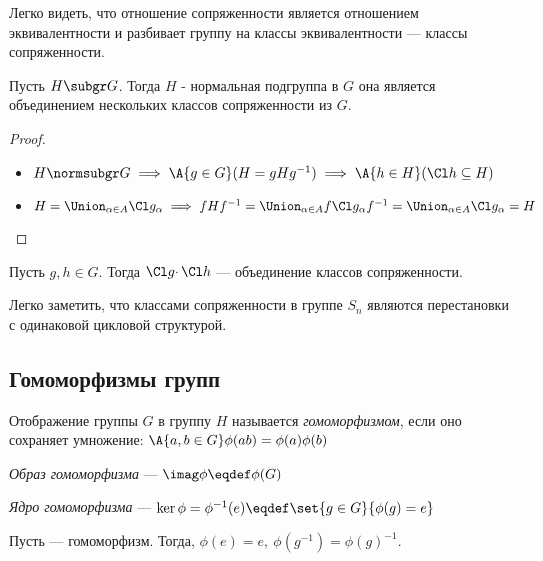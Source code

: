 Легко видеть, что отношение сопряженности является отношением эквивалентности и разбивает группу на классы эквивалентности --- классы сопряженности.

\begin{theorem}
  Пусть $H \subgr G$. Тогда $H$ - нормальная подгруппа в $G$ \iff она является объединением нескольких классов сопряженности из $G$.
\end{theorem}
\begin{proof}
  \theoremlistshack
  \begin{itemize}
    \item[\implies] $H\normsubgr G \implies \A{g \in G}(H=gHg^{-1}) \implies \A{h \in H}(\Cl h\subseteq H)$
    \item[\impliedby] \sloppy $H=\Union_{\alpha\in A}\Cl g_\alpha \implies fHf^{-1}=\Union_{\alpha\in A}f\Cl g_\alpha f^{-1}=\Union_{\alpha\in A}\Cl g_\alpha=H$
  \end{itemize}
\end{proof}

\begin{theorem}
  Пусть $g, h \in G$. Тогда $\Cl g \cdotp\Cl h$ --- объединение классов сопряженности.
\end{theorem}

\begin{example}
  Легко заметить, что классами сопряженности в группе $S_n$ являются перестановки с одинаковой цикловой структурой.
\end{example}

\subsection{Гомоморфизмы групп}
\begin{definition}
  Отображение  группы $G$ в группу $H$ называется \emph{гомоморфизмом}, если оно сохраняет умножение: $\A{a,b \in G} \phi(ab)=\phi(a)\phi(b)$
\end{definition}

\begin{definition}
  \emph{Образ гомоморфизма} --- $\imag\phi\eqdef\phi(G)$
\end{definition}

\begin{definition}
  \emph{Ядро гомоморфизма} --- $\ker\phi=\phi^{-1}(e)\eqdef\set{g\in G}{\phi(g)=e}$
\end{definition}

\begin{theorem}
  Пусть \phi --- гомоморфизм. Тогда, $\phi(e)=e,\ \phi(g^{-1})=\phi(g)^{-1}$.
\end{theorem}

